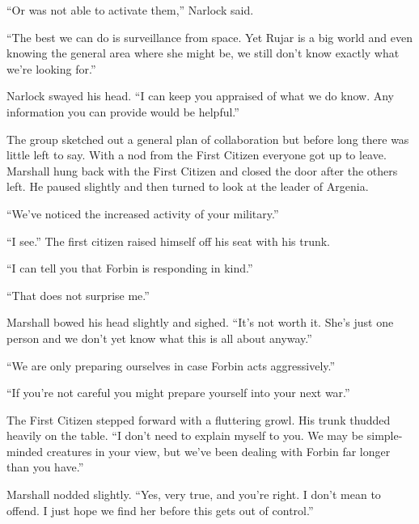 ``Or was not able to activate them,'' Narlock said.

``The best we can do is surveillance from space. Yet Rujar is a big world and even knowing the
general area where she might be, we still don't know exactly what we're looking for.''

Narlock swayed his head. ``I can keep you appraised of what we do know. Any information you can
provide would be helpful.''

The group sketched out a general plan of collaboration but before long there was little left to
say. With a nod from the First Citizen everyone got up to leave. Marshall hung back with the
First Citizen and closed the door after the others left. He paused slightly and then turned to
look at the leader of Argenia.

``We've noticed the increased activity of your military.''

``I see.'' The first citizen raised himself off his seat with his trunk.

``I can tell you that Forbin is responding in kind.''

``That does not surprise me.''

Marshall bowed his head slightly and sighed. ``It's not worth it. She's just one person and we
don't yet know what this is all about anyway.''

``We are only preparing ourselves in case Forbin acts aggressively.''

``If you're not careful you might prepare yourself into your next war.''

The First Citizen stepped forward with a fluttering growl. His trunk thudded heavily on the
table. ``I don't need to explain myself to you. We may be simple-minded creatures in your view,
but we've been dealing with Forbin far longer than you have.''

Marshall nodded slightly. ``Yes, very true, and you're right. I don't mean to offend. I just
hope we find her before this gets out of control.''

